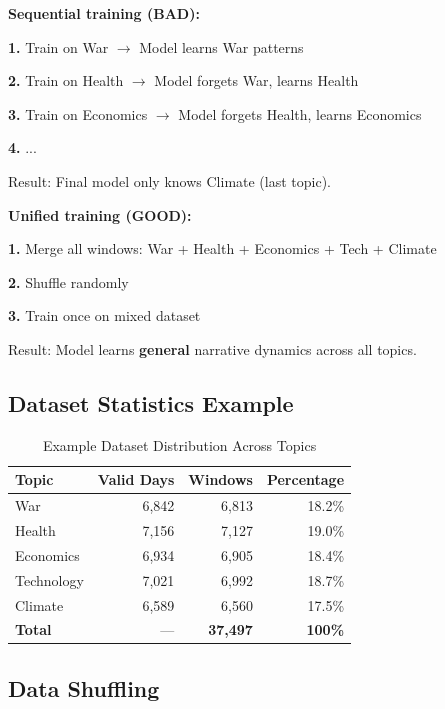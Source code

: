 \documentclass[12pt]{article}
\begin{document}
\begin{tcolorbox}[colback=red!5!white, colframe=red!75!black, title=Preventing Catastrophic Forgetting]
\textbf{Sequential training (BAD):}

\textbf{1.} Train on War $\rightarrow$ Model learns War patterns

\textbf{2.} Train on Health $\rightarrow$ Model forgets War, learns Health

\textbf{3.} Train on Economics $\rightarrow$ Model forgets Health, learns Economics

\textbf{4.} ...

Result: Final model only knows Climate (last topic).

\textbf{Unified training (GOOD):}

\textbf{1.} Merge all windows: War + Health + Economics + Tech + Climate

\textbf{2.} Shuffle randomly

\textbf{3.} Train once on mixed dataset

Result: Model learns \textbf{general} narrative dynamics across all topics.
\end{tcolorbox}

\subsection{Dataset Statistics Example}

\begin{table}[H]
\centering
\begin{tabular}{lrrr}
\toprule
Topic & Valid Days & Windows & Percentage \\
\midrule
War & 6,842 & 6,813 & 18.2\% \\
Health & 7,156 & 7,127 & 19.0\% \\
Economics & 6,934 & 6,905 & 18.4\% \\
Technology & 7,021 & 6,992 & 18.7\% \\
Climate & 6,589 & 6,560 & 17.5\% \\
\midrule
\textbf{Total} & --- & \textbf{37,497} & \textbf{100\%} \\
\bottomrule
\end{tabular}
\caption{Example Dataset Distribution Across Topics}
\end{table}

\subsection{Data Shuffling}
\end{document}
